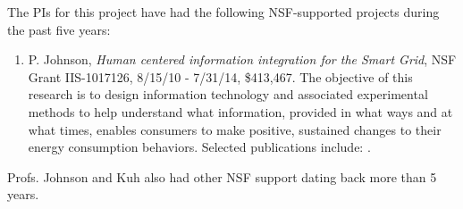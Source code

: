 


The PIs for this project have had the following NSF-supported projects during the past five years:

\begin{enumerate}
\item P. Johnson, {\em Human centered information integration for the Smart Grid}, NSF
  Grant IIS-1017126, 8/15/10 - 7/31/14, \$413,467. The objective of this
  research is to design information technology and associated experimental
  methods to help understand what information, provided in what ways and at
  what times, enables consumers to make positive, sustained changes to
  their energy consumption behaviors. Selected publications include:
  \cite{csdl2-10-05,csdl2-10-07,csdl2-10-08,csdl2-11-02,csdl2-11-03,csdl2-12-06,csdl2-11-07, csdl2-12-12,csdl2-13-10,csdl2-13-05,csdl2-13-03}.
  

  


\end{enumerate}


Profs. Johnson and Kuh also had other NSF support dating back more than 5 years.


